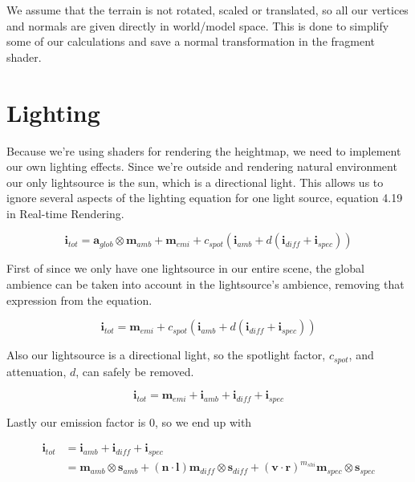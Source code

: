 We assume that the terrain is not rotated, scaled or translated, so
all our vertices and normals are given directly in world/model
space. This is done to simplify some of our calculations and save a
normal transformation in the fragment shader.

\section{Lighting}

Because we're using shaders for rendering the heightmap, we need to
implement our own lighting effects. Since we're outside and rendering
natural environment our only lightsource is the sun, which is a
directional light. This allows us to ignore several aspects of the
lighting equation for one light source, equation 4.19 in Real-time
Rendering. 

\begin{displaymath}
  \mathbf{i}_{tot} = \mathbf{a}_{glob} \otimes \mathbf{m}_{amb} +
  \mathbf{m}_{emi} + c_{spot}(\mathbf{i}_{amb} + d(\mathbf{i}_{diff} + \mathbf{i}_{spec}))
\end{displaymath}

First of since we only have one lightsource in our entire
scene, the global ambience can be taken into account in the
lightsource's ambience, removing that expression from the
equation.

\begin{displaymath}
  \mathbf{i}_{tot} = \mathbf{m}_{emi} + c_{spot}(\mathbf{i}_{amb} + d(\mathbf{i}_{diff} + \mathbf{i}_{spec}))
\end{displaymath}

Also our lightsource is a directional light, so the spotlight factor,
$c_{spot}$, and attenuation, $d$, can safely be removed.

\begin{displaymath}
  \mathbf{i}_{tot} = \mathbf{m}_{emi} + \mathbf{i}_{amb} + \mathbf{i}_{diff} + \mathbf{i}_{spec}
\end{displaymath}

Lastly our emission factor is 0, so we end up with

\begin{displaymath}
  \begin{array}{rl}
    \mathbf{i}_{tot} &= \mathbf{i}_{amb} + \mathbf{i}_{diff} +
    \mathbf{i}_{spec}\\
    &= \mathbf{m}_{amb} \otimes \mathbf{s}_{amb} + (\mathbf{n} \cdot
    \mathbf{l}) \mathbf{m}_{diff} \otimes \mathbf{s}_{diff} +
    (\mathbf{v} \cdot \mathbf{r})^{m_{shi}} \mathbf{m}_{spec} \otimes
    \mathbf{s}_{spec} 
  \end{array}
\end{displaymath}


